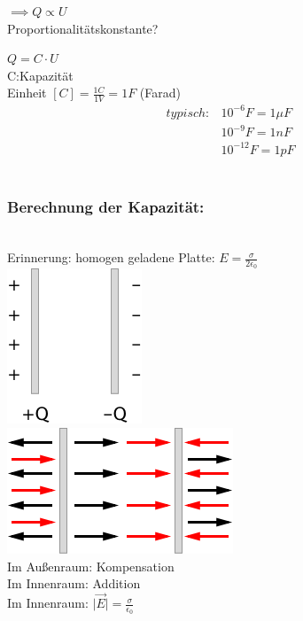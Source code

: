\documentclass[11pt]{article}
\begin{document}
$ \implies Q\propto U $\\

Proportionalitätskonstante?

$\boxed{Q=C\cdot U}$\\

C:Kapazität\\
Einheit $[C]=\frac{1C}{1V}=1F$ (Farad)\\

\begin{align*}
	typisch:& 10^{-6}F=1\mu F\\
	& 10^{-9}F=1nF\\
	& 10^{-12}F=1pF
\end{align*}\\

\subsubsection{Berechnung der Kapazität:}
\hfill\\
Erinnerung: homogen geladene Platte: $E=\frac{\sigma}{2\epsilon_0}$\\

\includegraphics{skizzen/14/14_8B5}\\

\includegraphics{skizzen/14/14_8B6}\\

Im Außenraum: Kompensation\\
Im Innenraum: Addition\\

Im Innenraum: $\vert\vec{E}\vert=\frac{\sigma}{\epsilon_0}$\\
\end{document}
